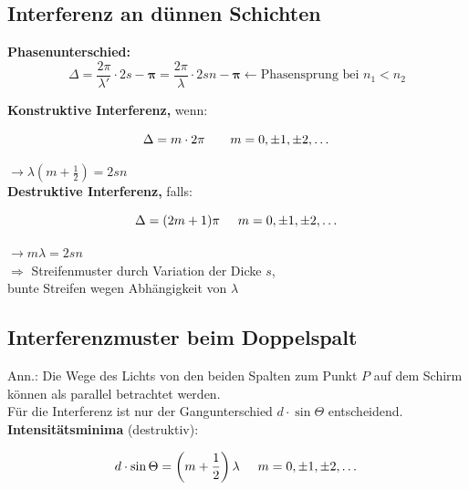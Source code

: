 \subsection{Interferenz an dünnen Schichten}
\textbf{Phasenunterschied:}
\[
    \Delta = \frac{2 \pi}{\lambda'} \cdot 2s - \boldsymbol{\pi} = \frac{2\pi}{\lambda} \cdot 2sn - \boldsymbol{\pi} \leftarrow \text{Phasensprung bei } n_1 < n_2
\]

\textbf{Konstruktive Interferenz,} wenn:

\begin{formulabox}
    \[
        \Delta = m \cdot 2\pi \hspace{7mm} m = 0,  \pm 1, \pm 2, \dots
    \]
\end{formulabox}
    \hspace{5mm} $\rightarrow \lambda(m+\frac{1}{2}) = 2sn$ \\[1ex]
\textbf{Destruktive Interferenz,} falls:

\begin{formulabox}
    \[
        \Delta = (2m + 1)\pi \hspace{5mm} m = 0,  \pm 1, \pm 2, \dots
    \]
\end{formulabox}
    \hspace{5mm} $\rightarrow m\lambda = 2sn$ \\[1ex]

$\Rightarrow$ Streifenmuster durch Variation der Dicke $s$, \\ 
\hspace{3mm} bunte Streifen wegen Abhängigkeit von $\lambda$

\subsection{Interferenzmuster beim Doppelspalt}
Ann.: Die Wege des Lichts von den beiden Spalten zum Punkt $P$ auf dem Schirm können als parallel betrachtet werden. \\[1ex]
Für die Interferenz ist nur der Gangunterschied $d \cdot \sin{\Theta}$ entscheidend. \\[1ex]

\textbf{Intensitätsminima} (destruktiv):

\begin{formulabox}
    \[
        d \cdot \sin{\Theta} = \left(m + \frac{1}{2}\right) \lambda \hspace{5mm} m = 0,  \pm 1, \pm 2, \dots
    \]
\end{formulabox}

